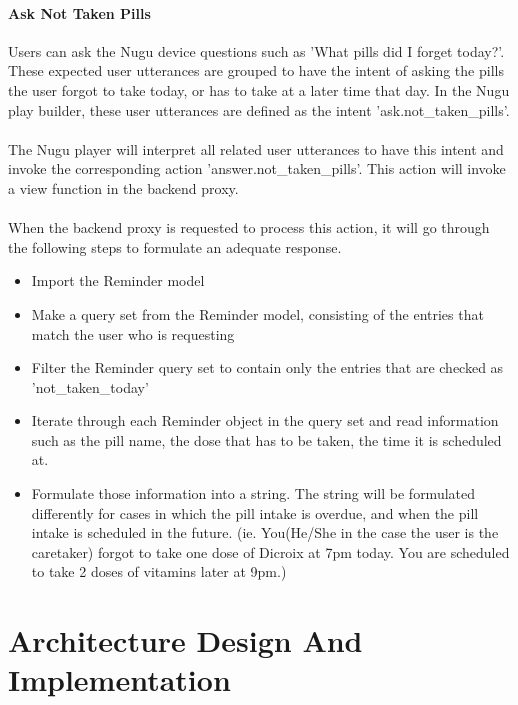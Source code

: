 \documentclass[conference]{IEEEtran}
\begin{document}
\paragraph{Ask Not Taken Pills}
Users can ask the Nugu device questions such as 'What pills did I forget today?'. These expected user utterances are grouped to have the intent of asking the pills the user forgot to take today, or has to take at a later time that day. In the Nugu play builder, these user utterances are defined as the intent 'ask.not\_taken\_pills'. \\ \\
The Nugu player will interpret all related user utterances to have this intent and invoke the corresponding action 'answer.not\_taken\_pills'. This action will invoke a view function in the backend proxy. \\ \\
When the backend proxy is requested to process this action, it will go through the following steps to formulate an adequate response.
\begin{itemize}
    \item Import the Reminder model\\
    \item Make a query set from the Reminder model, consisting of the entries that match the user who is requesting\\
    \item Filter the Reminder query set to contain only the entries that are checked as 'not\_taken\_today'\\
    \item Iterate through each Reminder object in the query set and read information such as the pill name, the dose that has to be taken, the time it is scheduled at.\\
    \item Formulate those information into a string. The string will be formulated differently for cases in which the pill intake is overdue, and when the pill intake is scheduled in the future. (ie. You(He/She in the case the user is the caretaker) forgot to take one dose of Dicroix at 7pm today. You are scheduled to take 2 doses of vitamins later at 9pm.)\\
\end{itemize}

\noindent
\newpage

\section{Architecture Design And Implementation}
\end{document}
